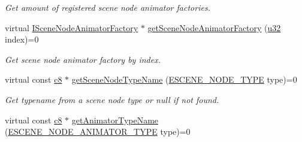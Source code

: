 \begin{DoxyCompactItemize}
\begin{DoxyCompactList}\small\item\em Get amount of registered scene node animator factories. \end{DoxyCompactList}\item 
virtual \hyperlink{classirr_1_1scene_1_1ISceneNodeAnimatorFactory}{I\+Scene\+Node\+Animator\+Factory} $\ast$ \hyperlink{classirr_1_1scene_1_1ISceneManager_a96d8272b74bd0adc9138f17e832dc887}{get\+Scene\+Node\+Animator\+Factory} (\hyperlink{namespaceirr_a0416a53257075833e7002efd0a18e804}{u32} index)=0
\begin{DoxyCompactList}\small\item\em Get scene node animator factory by index. \end{DoxyCompactList}\item 
virtual const \hyperlink{namespaceirr_a9395eaea339bcb546b319e9c96bf7410}{c8} $\ast$ \hyperlink{classirr_1_1scene_1_1ISceneManager_a9f8cc1f55b8e067528b7a9a21b7fdd50}{get\+Scene\+Node\+Type\+Name} (\hyperlink{namespaceirr_1_1scene_acad3d7ef92a9807d391ba29120f3b7bd}{E\+S\+C\+E\+N\+E\+\_\+\+N\+O\+D\+E\+\_\+\+T\+Y\+PE} type)=0\hypertarget{classirr_1_1scene_1_1ISceneManager_a9f8cc1f55b8e067528b7a9a21b7fdd50}{}\label{classirr_1_1scene_1_1ISceneManager_a9f8cc1f55b8e067528b7a9a21b7fdd50}

\begin{DoxyCompactList}\small\item\em Get typename from a scene node type or null if not found. \end{DoxyCompactList}\item 
virtual const \hyperlink{namespaceirr_a9395eaea339bcb546b319e9c96bf7410}{c8} $\ast$ \hyperlink{classirr_1_1scene_1_1ISceneManager_aeedfa596280048e6ea6463ff69d23855}{get\+Animator\+Type\+Name} (\hyperlink{namespaceirr_1_1scene_a327a1e43872705cf8f3f3342fb307d19}{E\+S\+C\+E\+N\+E\+\_\+\+N\+O\+D\+E\+\_\+\+A\+N\+I\+M\+A\+T\+O\+R\+\_\+\+T\+Y\+PE} type)=0\hypertarget{classirr_1_1scene_1_1ISceneManager_aeedfa596280048e6ea6463ff69d23855}{}\label{classirr_1_1scene_1_1ISceneManager_aeedfa596280048e6ea6463ff69d23855}


\end{DoxyCompactItemize}
